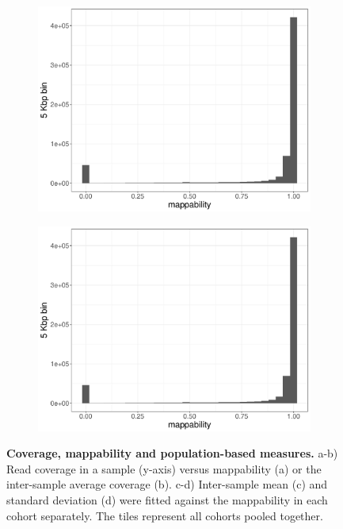 \begin{figure}[htp]
  \begin{subfigure}[b]{.48\textwidth}
    \includegraphics[width=\linewidth,page=7]{figures/wgs-map-coverage-cohorts.pdf}
    \caption{}
    \label{fig:meancohort}
  \end{subfigure}
  \begin{subfigure}[b]{.48\textwidth}
    \includegraphics[width=\linewidth,page=8]{figures/wgs-map-coverage-cohorts.pdf}
    \caption{}
    \label{fig:sdcohort}
  \end{subfigure}

  \caption[Coverage, mappability and population-based measures]{{\bf Coverage, mappability and population-based measures.} {\small a-b) Read coverage in a sample (y-axis) versus mappability (a) or the inter-sample average coverage (b). c-d) Inter-sample mean (c) and standard deviation (d) were fitted against the mappability in each cohort separately. The tiles represent all cohorts pooled together.}}
\end{figure}

